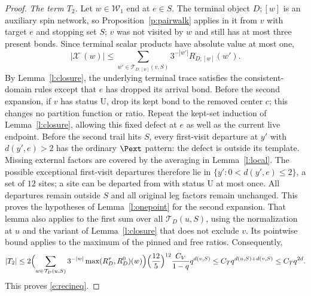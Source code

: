 \begin{proof}
\emph{The term $T_2$.} Let $w\in\mathcal W_1$ end at $e\in S$.
The terminal object $D;[w]$ is an auxiliary spin network, so
Proposition~\ref{p:pairwalk} applies in it from $v$ with target $e$
and stopping set $S$; $v$ was not visited by $w$ and still has at
most three present bonds. Since terminal scalar products have absolute
value at most one,
\[
|\mathcal X^\cdot(w)|\le
\sum_{w'\in\mathcal T_{D;[w]}(v,S)}
3^{-|w'|}R^\cdot_{D;[w]}(w').
\]
By Lemma~\ref{l:closure}, the underlying terminal trace satisfies the
consistent-domain rules except that $e$ has dropped its arrival bond.
Before the second expansion, if $v$ has status $\mathrm U$, drop
its kept bond to the removed center $c$; this changes no partition
function or ratio. Repeat the kept-set induction of
Lemma~\ref{l:closure}, allowing this fixed defect at $e$ as well as
the current live endpoint. Before the second trail hits $S$, every
first-visit departure at $y'$ with $d(y',e)>2$ has the ordinary
$\Pext$ pattern: the defect is outside its template. Missing
external factors are covered by the averaging in
Lemma~\ref{l:local}. The possible exceptional first-visit departures
therefore lie in $\{y':0<d(y',e)\le2\}$, a set of $12$ sites;
a site can be departed from with status $\mathrm U$ at most once.
All departures remain outside $S$ and all original leg factors remain
unchanged. This proves the hypotheses of Lemma~\ref{l:onepoint} for
the second expansion. That lemma also applies to the first sum over
all $\mathcal T_D(u,S)$, using the normalization at $u$ and the
variant of Lemma~\ref{l:closure} that does not exclude $v$. Its
pointwise bound applies to the maximum of the pinned and free ratios.
Consequently,
\begin{equation*}
|T_2| \le 2 \Bigl( \sum_{w \in \mathcal T_D(u, S)} 3^{-|w|} \max(R^\tau_D, R^0_D)(w) \Bigr) \Bigl( \frac{12}{5} \Bigr)^{12} \frac{C_V}{1 - q} q^{d(v, S)} \le C_T q^{d(u, S) + d(v, S)} \le C_T q^{2d} .
\end{equation*}
This proves \eqref{e:recineq}.


\end{proof}
